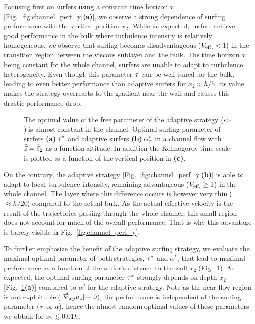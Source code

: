 Focusing first on surfers using a constant time horizon $\tau$ [Fig.~\ref{fig:channel_perf_y}\textbf{(a)}], we observe a strong dependence of surfing performance with the vertical position $x_2$.
While as expected, surfers achieve good performance in the bulk where turbulence intensity is relatively homogeneous, we observe that surfing becomes disadvantageous ($V_{\mathrm{eff.}} < 1$) in the transition region between the viscous sublayer and the bulk.
The time horizon $\tau$ being constant for the whole channel, surfers are unable to adapt to turbulence heterogeneity.
Even though this parameter $\tau$ can be well tuned for the bulk, leading to even better performance than adaptive surfers for $x_2 \approx h/5$, its value makes the strategy overreacts to the gradient near the wall and causes this drastic performance drop.
\begin{figure}
	\centering
	
	\caption[The optimal value of the free parameter of the adaptive strategy ($\alpha_{\TimeHorizon}$) is almost constant in the channel.]{
		The optimal value of the free parameter of the adaptive strategy ($\alpha_{\TimeHorizon}$) is almost constant in the channel.
		Optimal surfing parameter of surfers \textbf{(a)} $\tau^*$ and adaptive surfers \textbf{(b)} $\alpha_{\tau}^*$ in a channel flow with $\hat{\vec{z}} = \hat{\vec{e}}_2$ as a function altitude. 
		In addition the Kolmogorov time scale is plotted as a function of the vertical position in \textbf{(c)}.
	}
	\label{fig:max_channel_binned_velocity_y}
\end{figure}

On the contrary, the adaptive strategy [Fig.~\ref{fig:channel_perf_y}\textbf{(b)}] is able to adapt to local turbulence intensity, remaining advantageous ($V_{\mathrm{eff.}} \ge 1$) in the whole channel.
The layer where this difference occurs is however very thin ($\approx h/20$) compared to the actual bulk.
As the actual effective velocity is the result of the trajectories passing through the whole channel, this small region does not account for much of the overall performance.
That is why this advantage is barely visible in Fig.~\ref{fig:channel_perf_y}.

To further emphasize the benefit of the adaptive surfing strategy, we evaluate the maximal optimal parameter of both strategies, $\tau^*$ and $\alpha^*$, that lead to maximal performance as a function of the surfer's distance to the wall $x_2$ (Fig.~\ref{fig:max_channel_binned_velocity_y}).
As expected, the optimal surfing parameter $\tau^*$ strongly depends on depth $x_2$ [Fig.~\ref{fig:max_channel_binned_velocity_y}\textbf{(a)}] compared to $\alpha^{*}$ for the adaptive strategy.
Note as the near flow region is not exploitable ($\lvert\vec{\nabla}_{xy} u_{z}\rvert = 0$), the performance is independent of the surfing parameter ($\tau$ or $\alpha$), hence the almost random optimal values of these parameters we obtain for $x_2 \lesssim 0.01 h$.

